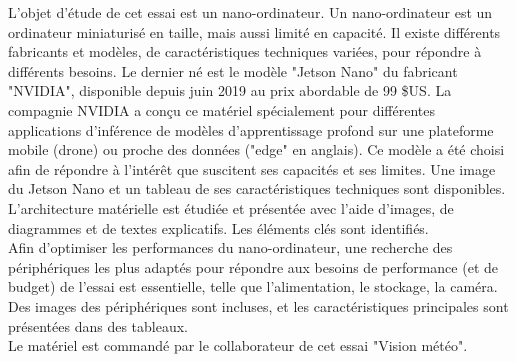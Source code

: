 ﻿\noindent L'objet d'étude de cet essai est un nano-ordinateur. Un nano-ordinateur est un ordinateur miniaturisé en taille, mais aussi limité en capacité. Il existe différents fabricants et modèles, de caractéristiques techniques variées, pour répondre à différents besoins. Le dernier né est le modèle "Jetson Nano" du fabricant "NVIDIA", disponible depuis juin 2019 au prix abordable de 99 \$US. La compagnie NVIDIA a conçu ce matériel spécialement pour différentes applications d'inférence de modèles d'apprentissage profond sur une plateforme mobile (drone) ou proche des données ("edge" en anglais). Ce modèle a été choisi afin de répondre à l'intérêt que suscitent ses capacités et ses limites. Une image du Jetson Nano et un tableau de ses caractéristiques techniques sont disponibles. 
\vspace{0.5\baselineskip}
\\
\noindent L'architecture matérielle est étudiée et présentée avec l'aide d'images, de diagrammes et de textes explicatifs. Les éléments clés sont identifiés.
\vspace{0.5\baselineskip}
\\
\noindent Afin d'optimiser les performances du nano-ordinateur, une recherche des périphériques les plus adaptés pour répondre aux besoins de performance (et de budget) de l'essai est essentielle, telle que l'alimentation, le stockage, la caméra. Des images des périphériques sont incluses, et les caractéristiques principales sont présentées dans des tableaux.
\vspace{0.5\baselineskip}
\\
\noindent Le matériel est commandé par le collaborateur de cet essai "Vision météo".